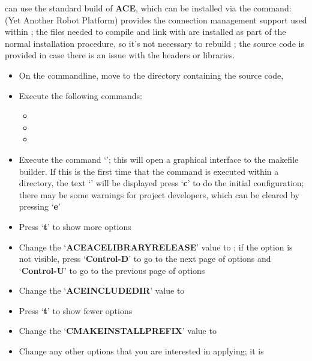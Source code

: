 \tertiaryEnd
{}
\mplusm{} can use the standard build of \textbf{ACE}, which can be installed via the
command:\\
\tertiaryEnd
\secondaryEnd
{}
\textbf{\yarp} (Yet Another Robot Platform) provides the connection management support
used within \mplusm{}; the files needed to compile and link with \yarp{} are installed as
part of the normal \mplusm{} installation procedure, so it's not necessary to rebuild
\yarp{}; the source code is provided in case there is an issue with the headers or
libraries.
\begin{itemize}
\item On the command\longDash{}line, move to the directory containing the \mplusm{} source
code, 
\item\exSp{}Execute the following commands:
\begin{itemize}
\item{}
\item\exSp{}
\item\exSp{}
\end{itemize}
\item\exSp{}Execute the command `'; this will open a graphical
interface to the makefile builder. If this is the first time that the command is executed
within a directory, the text `' will be displayed \longDash{} press
`\textbf{c}' to do the initial configuration; there may be some warnings for project
developers, which can be cleared by pressing `\textbf{e}'
\item\exSp{}Press `\textbf{t}' to show more options
\item\exSp{}Change the `\textbf{ACE\fUS{}ACE\fUS{}LIBRARY\fUS{}RELEASE}' value to
; if the option is not visible, press
`\textbf{Control-D}' to go to the next page of options and `\textbf{Control-U}' to go to
the previous page of options
\item\exSp{}Change the `\textbf{ACE\fUS{}INCLUDE\fUS{}DIR}' value to
\item\exSp{}Press `\textbf{t}' to show fewer options
\item\exSp{}Change the `\textbf{CMAKE\fUS{}INSTALL\fUS{}PREFIX}' value to
\item\exSp{}Change any other options that you are interested in applying; it is

\end{itemize}
